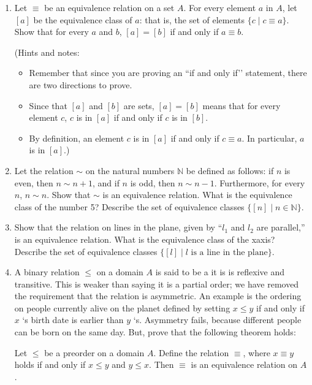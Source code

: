 \documentclass[letterpaper,10pt,english]{sphinxmanual}
\begin{document}
\begin{enumerate}
\item {} 
\sphinxAtStartPar
Let \(\equiv\) be an equivalence relation on a set \(A\). For every element \(a\) in \(A\), let \([a]\) be the equivalence class of \(a\): that is, the set of elements \(\{ c \mid c \equiv a \}\). Show that for every \(a\) and \(b\), \([a] = [b]\) if and only if \(a \equiv b\).

\sphinxAtStartPar
(Hints and notes:
\begin{itemize}
\item {} 
\sphinxAtStartPar
Remember that since you are proving an ``if and only if’’ statement, there are two directions to prove.

\item {} 
\sphinxAtStartPar
Since that \([a]\) and \([b]\) are sets, \([a] = [b]\) means that for every element \(c\), \(c\) is in \([a]\) if and only if \(c\) is in \([b]\).

\item {} 
\sphinxAtStartPar
By definition, an element \(c\) is in \([a]\) if and only if \(c \equiv a\). In particular, \(a\) is in \([a]\).)

\end{itemize}

\item {} 
\sphinxAtStartPar
Let the relation \(\sim\) on the natural numbers \(\mathbb{N}\) be defined as follows: if \(n\) is even, then \(n \sim n+1\), and if \(n\) is odd, then \(n \sim n-1\). Furthermore, for every \(n\), \(n \sim n\). Show that \(\sim\) is an equivalence relation. What is the equivalence class of the number 5? Describe the set of equivalence classes \(\{ [n] \mid n \in \mathbb{N} \}\).

\item {} 
\sphinxAtStartPar
Show that the relation on lines in the plane, given by “\(l_1\) and \(l_2\) are parallel,” is an equivalence relation. What is the equivalence class of the x\sphinxhyphen{}axis? Describe the set of equivalence classes \(\{ [l] \mid l\text{ is a line in the plane} \}\).

\item {} 
\sphinxAtStartPar
A binary relation \(\leq\) on a domain \(A\) is said to be a  it is is reflexive and transitive. This is weaker than saying it is a partial order; we have removed the requirement that the relation is asymmetric. An example is the ordering on people currently alive on the planet defined by setting \(x \leq y\) if and only if \(x\) ‘s birth date is earlier than \(y\) ‘s. Asymmetry fails, because different people can be born on the same day. But, prove that the following theorem holds:

\sphinxAtStartPar
{} Let \(\leq\) be a preorder on a domain \(A\). Define the relation \(\equiv\), where \(x \equiv y\) holds if and only if \(x \leq y\) and \(y \leq x\). Then \(\equiv\) is an equivalence relation on \(A\).

\end{enumerate}
\end{document}
